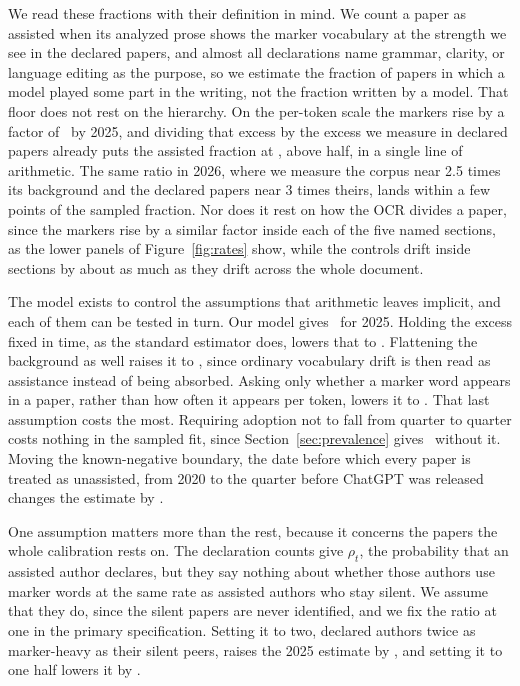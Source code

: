 \documentclass[twocolumn]{aastex631}
\begin{document}
We read these fractions with their definition in mind. We count a paper as assisted when its analyzed prose shows the marker vocabulary at the strength we see in the declared papers, and almost all declarations name grammar, clarity, or language editing as the purpose, so we estimate the fraction of papers in which a model played some part in the writing, not the fraction written by a model. That floor does not rest on the hierarchy. On the per-token scale the markers rise by a factor of \markerRiseFulltext\ by 2025, and dividing that excess by the excess we measure in declared papers already puts the assisted fraction at \ladderFullRungTwo, above half, in a single line of arithmetic. The same ratio in 2026, where we measure the corpus near 2.5 times its background and the declared papers near 3 times theirs, lands within a few points of the sampled fraction. Nor does it rest on how the OCR divides a paper, since the markers rise by a similar factor inside each of the five named sections, as the lower panels of Figure~\ref{fig:rates} show, while the controls drift inside sections by about as much as they drift across the whole document.

The model exists to control the assumptions that arithmetic leaves implicit, and each of them can be tested in turn. Our model gives \piFulltextHeadline\ for 2025. Holding the excess fixed in time, as the standard estimator does, lowers that to \ladderFullRungThree. Flattening the background as well raises it to \ladderFullRungTwo, since ordinary vocabulary drift is then read as assistance instead of being absorbed. Asking only whether a marker word appears in a paper, rather than how often it appears per token, lowers it to \ladderFullRungZero. That last assumption costs the most. Requiring adoption not to fall from quarter to quarter costs nothing in the sampled fit, since Section~\ref{sec:prevalence} gives \piUnconstrained\ without it. Moving the known-negative boundary, the date before which every paper is treated as unassisted, from 2020 to the quarter before ChatGPT was released changes the estimate by \boundaryShift.

One assumption matters more than the rest, because it concerns the papers the whole calibration rests on. The declaration counts give $\rho_t$, the probability that an assisted author declares, but they say nothing about whether those authors use marker words at the same rate as assisted authors who stay silent. We assume that they do, since the silent papers are never identified, and we fix the ratio at one in the primary specification. Setting it to two, declared authors twice as marker-heavy as their silent peers, raises the 2025 estimate by \gammaShiftUp, and setting it to one half lowers it by \gammaShiftDown.
\end{document}
